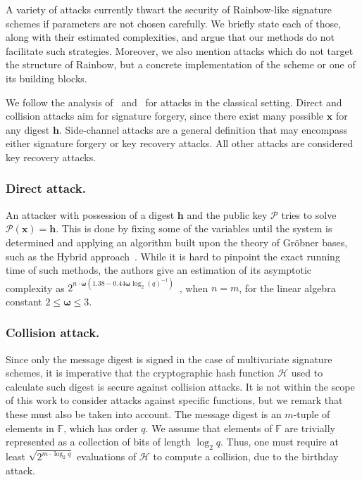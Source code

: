 \documentclass[12pt, a4paper, oneside]{memoir}
\theoremstyle{definition}
\begin{document}
A variety of attacks currently thwart the security of Rainbow-like signature schemes if parameters are not chosen carefully. We briefly state each of those, along with their estimated complexities, and argue that our methods do not facilitate such strategies. Moreover, we also mention attacks which do not target the structure of Rainbow, but a concrete implementation of the scheme or one of its building blocks. 

We follow the analysis of~\cite[Section 8]{Ding:201901} and~\cite{Petzoldt:201005} for attacks in the classical setting. Direct and collision attacks aim for signature forgery, since there exist many possible $\mathbf{x}$ for any digest $\mathbf{h}$. Side-channel attacks are a general definition that may encompass either signature forgery or key recovery attacks. All other attacks are considered key recovery attacks.

\subsubsection{Direct attack.} 

An attacker with possession of a digest $\mathbf{h}$ and the public key $\mathcal{P}$ tries to solve $\mathcal{P}(\mathbf{x}) = \mathbf{h}$. This is done by fixing some of the variables until the system is determined and applying an algorithm built upon the theory of Gröbner bases, such as the Hybrid approach~\cite{Bettale:201207}. While it is hard to pinpoint the exact running time of such methods, the authors give an estimation of its asymptotic complexity as $2^{n \cdot \bm{\omega} (1.38 - 0.44 \bm{\omega} \log_{2} (q)^{-1})}$~\cite[Theorem 3]{Bettale:201207}, when $n = m$, for the linear algebra constant $2 \leq \bm{\omega} \leq 3$.

\subsubsection{Collision attack.}

Since only the message digest is signed in the case of multivariate signature schemes, it is imperative that the cryptographic hash function $\mathcal{H}$ used to calculate such digest is secure against collision attacks. It is not within the scope of this work to consider attacks against specific functions, but we remark that these must also be taken into account. The message digest is an $m$-tuple of elements in $\mathbb{F}$, which has order $q$. We assume that elements of $\mathbb{F}$ are trivially represented as a collection of bits of length $\log_{2} q$. Thus, one must require at least $\sqrt{2^{m \cdot \log_{2} q}}$ evaluations of $\mathcal{H}$ to compute a collision, due to the birthday attack.
\end{document}
